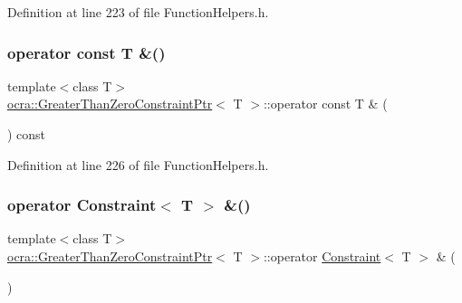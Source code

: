 Definition at line 223 of file Function\+Helpers.\+h.

\hypertarget{classocra_1_1GreaterThanZeroConstraintPtr_ad503d58867d41ae403fc1a34d7b844cf}{}\label{classocra_1_1GreaterThanZeroConstraintPtr_ad503d58867d41ae403fc1a34d7b844cf} 
\subsubsection{\texorpdfstring{operator const T \&()}{operator const T \&()}}
{\footnotesize\ttfamily template$<$class T$>$ \\
\hyperlink{classocra_1_1GreaterThanZeroConstraintPtr}{ocra\+::\+Greater\+Than\+Zero\+Constraint\+Ptr}$<$ T $>$\+::operator const T \& (\begin{DoxyParamCaption}{ }\end{DoxyParamCaption}) const\hspace{0.3cm}{\ttfamily [inline]}}



Definition at line 226 of file Function\+Helpers.\+h.

\hypertarget{classocra_1_1GreaterThanZeroConstraintPtr_a276bed22a9049cfee41cb189a1956838}{}\label{classocra_1_1GreaterThanZeroConstraintPtr_a276bed22a9049cfee41cb189a1956838} 
\subsubsection{\texorpdfstring{operator Constraint$<$ T $>$ \&()}{operator Constraint< T > \&()}}
{\footnotesize\ttfamily template$<$class T$>$ \\
\hyperlink{classocra_1_1GreaterThanZeroConstraintPtr}{ocra\+::\+Greater\+Than\+Zero\+Constraint\+Ptr}$<$ T $>$\+::operator \hyperlink{classocra_1_1Constraint}{Constraint}$<$ T $>$ \& (\begin{DoxyParamCaption}{ }\end{DoxyParamCaption})\hspace{0.3cm}{\ttfamily [inline]}}



